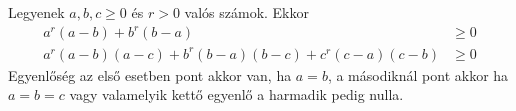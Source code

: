    Legyenek $a,b,c\ge 0$ és $r>0$ valós számok. Ekkor
   \begin{align*}
   a^{r}(a-b)+b^{r}(b-a) &\ge 0 \\
   a^{r}(a-b)(a-c)+b^{r}(b-a)(b-c)+c^{r}(c-a)(c-b)  &\ge 0
   \end{align*}
   Egyenlőség az első esetben pont akkor van, ha $a=b$, a másodiknál 
   pont akkor ha $a=b=c$ vagy valamelyik kettő egyenlő a harmadik pedig nulla.
